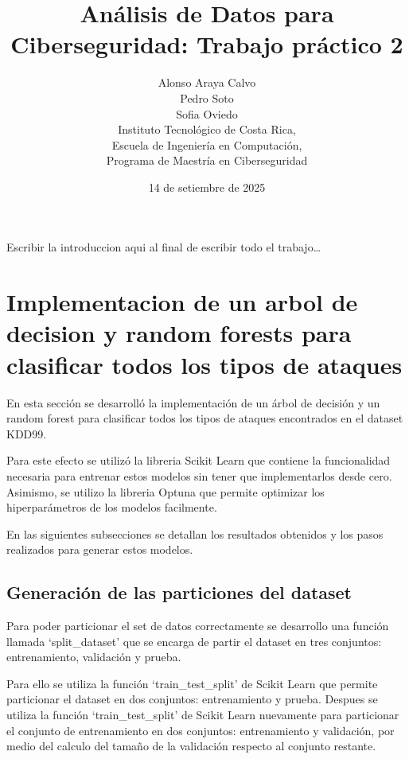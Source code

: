 \documentclass[12pt,a4paper]{article}
\begin{document}
\title{Análisis de Datos para Ciberseguridad: Trabajo práctico 2}

\author{
  Alonso Araya Calvo \\
  Pedro Soto \\
  Sofia Oviedo \\
  Instituto Tecnológico de Costa Rica, \\
  Escuela de Ingeniería en Computación, \\
  Programa de Maestría en Ciberseguridad
}

\date{ 14 de setiembre de 2025 }
\maketitle

Escribir la introduccion aqui al final de escribir todo el trabajo\ldots

\section{Implementacion de un arbol de decision
  y random forests para clasificar todos los
tipos de ataques}

En esta sección se desarrolló la implementación de un árbol de decisión y
un random forest para clasificar todos los tipos de ataques encontrados en el dataset KDD99.

Para este efecto se utilizó la libreria Scikit Learn que contiene la funcionalidad necesaria para
entrenar estos modelos sin tener que implementarlos desde cero. Asimismo, se utilizo la libreria
Optuna que permite optimizar los hiperparámetros de los modelos facilmente.

En las siguientes subsecciones se detallan los resultados obtenidos y los pasos realizados
para generar estos modelos.

\subsection{Generación de las particiones del dataset}

Para poder particionar el set de datos correctamente se desarrollo una función llamada
`split_dataset' que se encarga de partir el dataset en tres conjuntos: entrenamiento,
validación y prueba.

Para ello se utiliza la función `train_test_split' de Scikit Learn que permite particionar el dataset
en dos conjuntos: entrenamiento y prueba.
Despues se utiliza la función `train_test_split' de Scikit Learn nuevamente para particionar el conjunto de entrenamiento
en dos conjuntos: entrenamiento y validación, por medio del calculo del tamaño de la validación
respecto al conjunto restante.
\end{document}
